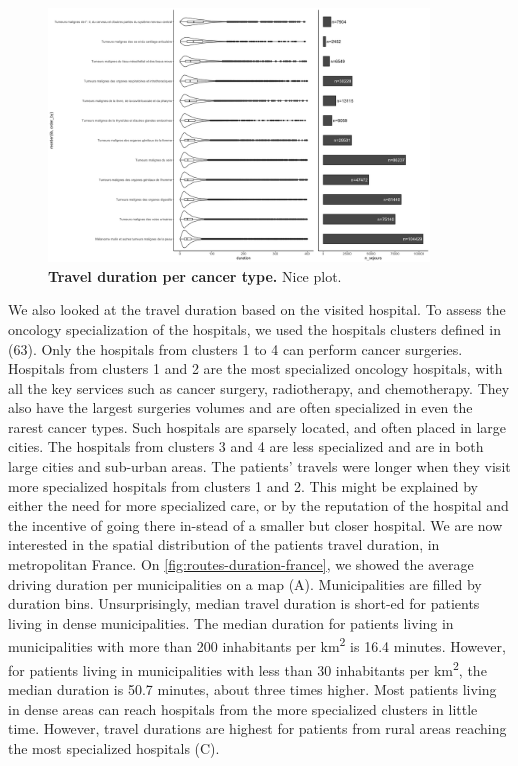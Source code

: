 \begin{figure}[h]
    \includegraphics[width=0.9\textwidth]{images/routes/fig8_top.png}
    \centering
    \caption{ \textbf{Travel duration per cancer type.} Nice plot. }
    \label{fig:travel-duration-cancer-type}
\end{figure}

We also looked at the travel duration based on the
visited hospital. To assess the oncology specialization of the hospitals, we
used the hospitals clusters defined in (63). Only the hospitals from clusters 1
to 4 can perform cancer surgeries. Hospitals from clusters 1 and 2 are the most
specialized oncology hospitals, with all the key services such as cancer
surgery, radiotherapy, and chemotherapy. They also have the largest surgeries
volumes and are often specialized in even the rarest cancer types. Such
hospitals are sparsely located, and often placed in large cities. The hospitals
from clusters 3 and 4 are less specialized and are in both large cities and
sub-urban areas. The patients' travels were longer when they visit more
specialized hospitals from clusters 1 and 2. This might be explained by either
the need for more specialized care, or by the reputation of the hospital and the
incentive of going there in-stead of a smaller but closer hospital. We are now
interested in the spatial distribution of the patients travel duration, in
metropolitan France. On \cref{fig:routes-duration-france}, we showed the average
driving duration per municipalities on a map (A). Municipalities are filled by
duration bins. Unsurprisingly, median travel duration is short-ed for patients
living in dense municipalities. The median duration for patients living in
municipalities with more than 200 inhabitants per km\textsuperscript{2} is 16.4
minutes. However, for patients living in municipalities with less than 30
inhabitants per km\textsuperscript{2}, the median duration is 50.7 minutes,
about three times higher. Most patients living in dense areas can reach
hospitals from the more specialized clusters in little time. However, travel
durations are highest for patients from rural areas reaching the most
specialized hospitals (C).

